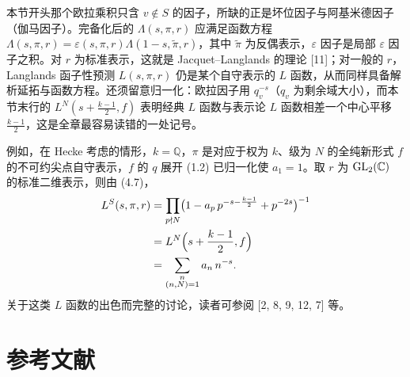 \begin{annote}
本节开头那个欧拉乘积只含 $v\notin S$ 的因子，所缺的正是坏位因子与阿基米德因子（伽马因子）。完备化后的 $\Lambda(s,\pi,r)$ 应满足函数方程 $\Lambda(s,\pi,r)=\varepsilon(s,\pi,r)\Lambda(1-s,\tilde\pi,r)$，其中 $\tilde\pi$ 为反偶表示，$\varepsilon$ 因子是局部 $\varepsilon$ 因子之积。对 $r$ 为标准表示，这就是 Jacquet–Langlands 的理论 [11]；对一般的 $r$，Langlands 函子性预测 $L(s,\pi,r)$ 仍是某个自守表示的 $L$ 函数，从而同样具备解析延拓与函数方程。还须留意归一化：欧拉因子用 $q_v^{-s}$（$q_v$ 为剩余域大小），而本节末行的 $L^N(s+\frac{k-1}{2},f)$ 表明经典 $L$ 函数与表示论 $L$ 函数相差一个中心平移 $\frac{k-1}{2}$，这是全章最容易读错的一处记号。

\par{}
\end{annote}

例如，在 Hecke 考虑的情形，$k=\mathbb{Q}$，$\pi$ 是对应于权为 $k$、级为 $N$ 的全纯新形式 $f$ 的不可约尖点自守表示，$f$ 的 $q$ 展开 (1.2) 已归一化使 $a_1=1$。取 $r$ 为 $\mathrm{GL}_2(\mathbb{C})$ 的标准二维表示，则由 (4.7)，
\begin{equation*}
\begin{aligned}
L^S(s,\pi,r)&=\prod_{p\nmid N}\bigl(1-a_p\,p^{-s-\frac{k-1}{2}}+p^{-2s}\bigr)^{-1}\\
&=L^N\Bigl(s+\frac{k-1}{2},f\Bigr)\\
&=\sum_{\substack{n\\ (n,N)=1}}a_n\,n^{-s}.
\end{aligned}
\end{equation*}
关于这类 $L$ 函数的出色而完整的讨论，读者可参阅 [2, 8, 9, 12, 7] 等。

\section*{参考文献}

